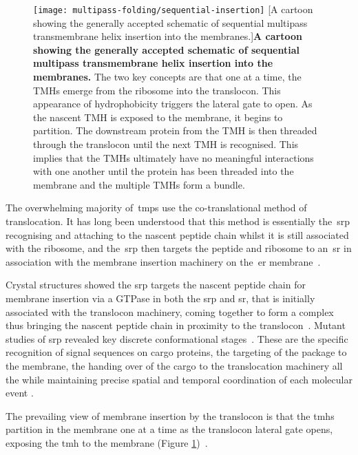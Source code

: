 \begin{figure}[!ht]
\centering
\texttt{[image: multipass-folding/sequential-insertion]}
        [A cartoon showing the generally accepted schematic of sequential multipass transmembrane helix insertion into the membranes.]{\textbf{A cartoon showing the generally accepted schematic of sequential multipass transmembrane helix insertion into the membranes.}
        The two key concepts are that one at a time, the TMHs emerge from the ribosome into the translocon.
        This appearance of hydrophobicity triggers the lateral gate to open.
        As the nascent TMH is exposed to the membrane, it begins to partition.
        The downstream protein from the TMH is then threaded through the translocon until the next TMH is recognised.
        This implies that the TMHs ultimately have no meaningful interactions with one another until the protein has been threaded into the membrane and the multiple TMHs form a bundle.
}
\label{fig:sequential-insertion}
\end{figure}

The overwhelming majority of~\gls{tmp}s use the co-translational method of translocation.
It has long been understood that this method is essentially the~\gls{srp} recognising and attaching to the nascent peptide chain whilst it is still associated with the ribosome, and the~\gls{srp} then targets the peptide and ribosome to an~\gls{sr} in association with the membrane insertion machinery on the~\gls{er} membrane~\cite{Pool2005, Hessa2005}.

Crystal structures showed the \gls{srp} targets the nascent peptide chain for membrane insertion via a GTPase in both the \gls{srp} and \gls{sr}, that is initially associated with the translocon machinery, coming together to form a complex thus bringing the nascent peptide chain in proximity to the translocon~\cite{Shan2005}.
Mutant studies of \gls{srp} revealed key discrete conformational stages~\cite{Shan2005}.
These are the specific recognition of signal sequences on cargo proteins, the targeting of the package to the membrane, the handing over of the cargo to the translocation machinery all the while maintaining precise spatial and temporal coordination of each molecular event \cite{Saraogi2011}.


The prevailing view of membrane insertion by the translocon is that the \gls{tmh}s partition in the membrane one at a time as the translocon lateral gate opens, exposing the \gls{tmh} to the membrane (Figure \ref{fig:sequential-insertion})~\cite{Cymer2015}.

